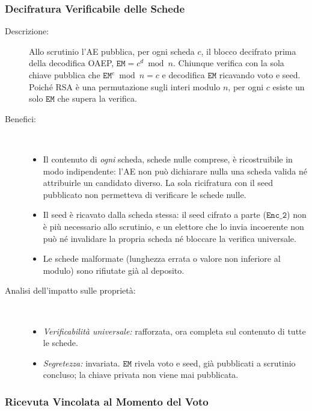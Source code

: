\documentclass[12pt,a4paper]{article}
\begin{document}
\subsubsection{Decifratura Verificabile delle Schede}
\label{sec:mod35}

\begin{description}
  \item[Descrizione:] Allo scrutinio l'AE pubblica, per ogni scheda $c$, il blocco decifrato prima della decodifica OAEP, $\mathtt{EM} = c^{d} \bmod n$. Chiunque verifica con la sola chiave pubblica che $\mathtt{EM}^{e} \bmod n = c$ e decodifica $\mathtt{EM}$ ricavando voto e seed. Poiché RSA è una permutazione sugli interi modulo $n$, per ogni $c$ esiste un solo $\mathtt{EM}$ che supera la verifica.
  \item[Benefici:] \
    \begin{itemize}
      \item Il contenuto di \emph{ogni} scheda, schede nulle comprese, è ricostruibile in modo indipendente: l'AE non può dichiarare nulla una scheda valida né attribuirle un candidato diverso. La sola ricifratura con il seed pubblicato non permetteva di verificare le schede nulle.
      \item Il seed è ricavato dalla scheda stessa: il seed cifrato a parte ($\mathtt{Enc\_2}$) non è più necessario allo scrutinio, e un elettore che lo invia incoerente non può né invalidare la propria scheda né bloccare la verifica universale.
      \item Le schede malformate (lunghezza errata o valore non inferiore al modulo) sono rifiutate già al deposito.
    \end{itemize}
  \item[Analisi dell'impatto sulle proprietà:] \
    \begin{itemize}
      \item \textit{Verificabilità universale:} rafforzata, ora completa sul contenuto di tutte le schede.
      \item \textit{Segretezza:} invariata. $\mathtt{EM}$ rivela voto e seed, già pubblicati a scrutinio concluso; la chiave privata non viene mai pubblicata.
    \end{itemize}
\end{description}

\subsubsection{Ricevuta Vincolata al Momento del Voto}
\label{sec:mod36}
\end{document}
